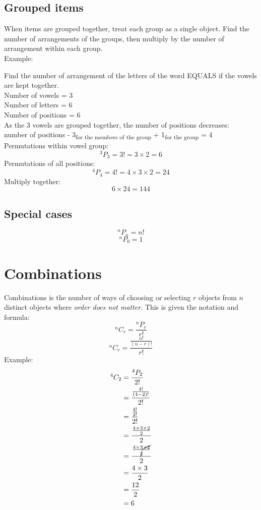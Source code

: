 \documentclass[a4paper,10pt]{report}
\begin{document}
		\subsection{Grouped items}
			When items are grouped together, treat each group as a single object.  Find the number of arrangements of the groups, then multiply by the number of arrangement within each group.\\
			Example:\\
			\begin{center}
				Find the number of arrangement of the letters of the word EQUALS if the vowels are kept together.\\
				Number of vowels = 3\\
				Number of letters = 6\\
				Number of positions = 6\\
				As the 3 vowels are grouped together, the number of positions decreases:\\ number of positions - 3\textsubscript{for the members of the group} + 1\textsubscript{for the group} = 4\\
				Permutations within vowel group:
				$$^3P_3 = 3! = 3 \times 2 = 6$$
				Permutations of all positions:
				$$^4P_4 = 4! = 4 \times 3 \times 2 = 24$$
				Multiply together:
				$$6 \times 24 = 144$$
			\end{center}

		\subsection{Special cases}
			$$^nP_n = n!$$
			$$^nP_0 = 1$$


	\section{Combinations}
		Combinations is the number of ways of choosing or selecting $r$ objects from $n$ distinct objects where \emph{order does not matter}.  This is given the notation and formula:
		$$^nC_r = \frac{^nP_r}{r!}$$
		$$^nC_r = \frac{\frac{n!}{(n-r)!}}{r!}$$
		Example:\\
		\begin{align*}
			^4C_2 & = \frac{^4P_2}{2!} \\
			      & = \frac{\frac{4!}{(4 - 2)!}}{2!} \\
			      & = \frac{\frac{4!}{2!}}{2!} \\
			      & = \frac{\frac{4 \times 3 \times 2}{2}}{2} \\
			      & = \frac{\frac{4 \times 3 \cancel{\times 2}}{\cancel{2}}}{2} \\
			      & = \frac{4 \times 3}{2} \\
			      & = \frac{12}{2} \\
			      & = 6 \\
		\end{align*}
\end{document}
